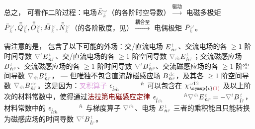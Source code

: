 总之， 可看作二阶过程：电场$\bar{E}^{\;\!\mathcolor{gray}{\omega}}_{\;\!\mathcolor{gray}{\bar{k}}}$（的各阶时空导数）$\xrightarrow[]{\text{驱动}}$ \textcolor{NavyBlue}{电磁多}极矩 $\bar{P}^{\;\!\mathcolor{gray}{\omega}}_{\;\!\mathcolor{gray}{\bar{k}}},\bar{\bar{Q}}^{\;\!\mathcolor{gray}{\omega}}_{\;\!\mathcolor{gray}{\bar{k}}},\bar{\bar{\bar{O}}}^{\;\!\mathcolor{gray}{\omega}}_{\;\!\mathcolor{gray}{\bar{k}}}; \bar{M}^{\;\!\mathcolor{gray}{\omega}}_{\;\!\mathcolor{gray}{\bar{k}}},\bar{\bar{N}}^{\;\!\mathcolor{gray}{\omega}}_{\;\!\mathcolor{gray}{\bar{k}}}$（的各阶散度，见）$\xrightarrow[]{\text{耦合至}}$ \textcolor{NavyBlue}{电偶}极矩 $\bar{P}^{\;\!\mathcolor{gray}{\omega}}_{\;\!\mathcolor{gray}{\bar{k}}}$。

需注意的是， 包含了以下可能的外场：交/直流电场 $E^{\;\!\mathcolor{gray}{t}}_{\;\! \hat{n} \mathcolor{gray}{\bar{r}}}$、交流电场的各 $\geq 1$ 阶时间导数 $\mathcolor{gray}{\nabla^t} E^{\;\!\mathcolor{gray}{t}}_{\;\! \hat{n} \mathcolor{gray}{\bar{r}}}$、交/直流电场的各 $\geq 1$ 阶空间导数 $\mathcolor{gray}{\nabla_{\hat{m}}} E^{\;\!\mathcolor{gray}{t}}_{\;\! \hat{n} \mathcolor{gray}{\bar{r}}}$；交流磁感应场 $B^{\;\!\mathcolor{gray}{t}}_{\;\! \hat{n} \mathcolor{gray}{\bar{r}}}$、交流磁感应场的各 $\geq 1$ 阶时间导数 $\mathcolor{gray}{\nabla^t} B^{\;\!\mathcolor{gray}{t}}_{\;\! \hat{n} \mathcolor{gray}{\bar{r}}}$、交流磁感应场的各 $\geq 1$ 阶空间导数 $\mathcolor{gray}{\nabla_{\hat{m}}} B^{\;\!\mathcolor{gray}{t}}_{\;\! \hat{n} \mathcolor{gray}{\bar{r}}}$， ---  但唯独不包含直流静磁感应场 $B^{\;\!\mathcolor{gray}{\text{dc}}}_{\;\! \hat{n} \mathcolor{gray}{\bar{r}}}$，及其各 $\geq 1$ 阶空间导数 $\mathcolor{gray}{\nabla_{\hat{m}}} B^{\;\!\mathcolor{gray}{\text{dc}}}_{\;\! \hat{n} \mathcolor{gray}{\bar{r}}}$。这是因为：\textcolor{Plum}{叉积算子} $\epsilon^{\hphantom{\symup{\iota}\hat{m}}\hat{n}}_{\hat{l}\hat{m}}$ 可以包含在 $\chi^{\;\! \mathcolor{gray}{\omega} \hat{1} \mathcolor{gray}{\hat{2}}}_{\;\! \symup{\iota} \textcolor{Maroon}{(1)}}$ 及以上阶次的材料常数中，使得通过\textcolor{Maroon}{法拉第电磁感应定律} $\epsilon^{\hphantom{\symup{\iota}\hat{m}}\hat{n}}_{\hat{l}\mathcolor{gray}{\hat{m}}} \mathcolor{gray}{\nabla^{\hat{m}}} E^{\;\!\mathcolor{gray}{t}}_{\;\! \hat{n} \mathcolor{gray}{\bar{r}}} = - \mathcolor{gray}{\nabla^t} B^{\;\!\mathcolor{gray}{t}}_{\;\! \hat{l} \mathcolor{gray}{\bar{r}}}$，材料常数中的 $\epsilon^{\hphantom{\symup{\iota}\hat{m}}\hat{n}}_{\hat{l}\hat{m}}$ 与梯度算子 $\mathcolor{gray}{\nabla^{\hat{m}}}$、电场 $E^{\;\!\mathcolor{gray}{t}}_{\;\! \hat{n} \mathcolor{gray}{\bar{r}}}$ 三者的乘积能且只能转换为磁感应场的时间导数 $\mathcolor{gray}{\nabla^t} B^{\;\!\mathcolor{gray}{t}}_{\;\! \hat{l} \mathcolor{gray}{\bar{r}}}$。

